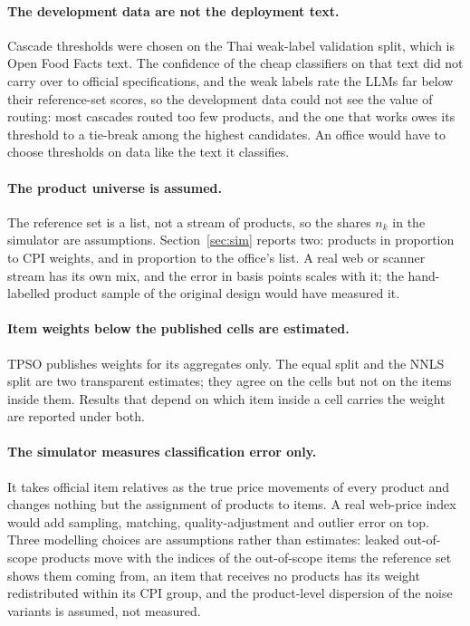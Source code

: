 \paragraph{The development data are not the deployment text.} Cascade thresholds were chosen
on the Thai weak-label validation split, which is Open Food Facts text. The confidence of the
cheap classifiers on that text did not carry over to official specifications, and the weak
labels rate the LLMs far below their reference-set scores, so the development data could not
see the value of routing: most cascades routed too few products, and the one that works owes
its threshold to a tie-break among the highest candidates. An office would have to choose thresholds on data like the
text it classifies.

\paragraph{The product universe is assumed.} The reference set is a list, not a stream of
products, so the shares $n_k$ in the simulator are assumptions. Section~\ref{sec:sim}
reports two: products in proportion to CPI weights, and in proportion to the office's list.
A real web or scanner stream has its own mix, and the error in basis points scales with it;
the hand-labelled product sample of the original design would have measured it.

\paragraph{Item weights below the published cells are estimated.} TPSO publishes weights for
its aggregates only. The equal split and the NNLS split are two transparent estimates; they
agree on the cells but not on the items inside them. Results that depend on which item
inside a cell carries the weight are reported under both.

\paragraph{The simulator measures classification error only.} It takes official item
relatives as the true price movements of every product and changes nothing but the
assignment of products to items. A real web-price index would add sampling, matching,
quality-adjustment and outlier error on top. Three modelling choices are assumptions rather
than estimates: leaked out-of-scope products move with the indices of the out-of-scope items
the reference set shows them coming from, an item
that receives no products has its weight redistributed within its CPI group, and the
product-level
dispersion of the noise variants is assumed, not measured.

